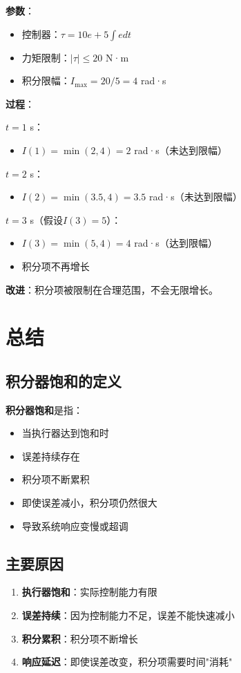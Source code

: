 \documentclass[12pt,a4paper]{article}
\begin{document}
\textbf{参数}：
\begin{itemize}
\item 控制器：$\tau = 10e + 5\int e dt$
\item 力矩限制：$|\tau| \leq 20$ N·m
\item 积分限幅：$I_{\max} = 20/5 = 4$ rad·s
\end{itemize}

\textbf{过程}：

$t = 1$ s：
\begin{itemize}
\item $I(1) = \min(2, 4) = 2$ rad·s（未达到限幅）
\end{itemize}

$t = 2$ s：
\begin{itemize}
\item $I(2) = \min(3.5, 4) = 3.5$ rad·s（未达到限幅）
\end{itemize}

$t = 3$ s（假设$I(3) = 5$）：
\begin{itemize}
\item $I(3) = \min(5, 4) = 4$ rad·s（达到限幅）
\item 积分项不再增长
\end{itemize}

\textbf{改进}：积分项被限制在合理范围，不会无限增长。

\section{总结}

\subsection{积分器饱和的定义}

\textbf{积分器饱和}是指：
\begin{itemize}
\item 当执行器达到饱和时
\item 误差持续存在
\item 积分项不断累积
\item 即使误差减小，积分项仍然很大
\item 导致系统响应变慢或超调
\end{itemize}

\subsection{主要原因}

\begin{enumerate}
\item \textbf{执行器饱和}：实际控制能力有限
\item \textbf{误差持续}：因为控制能力不足，误差不能快速减小
\item \textbf{积分累积}：积分项不断增长
\item \textbf{响应延迟}：即使误差改变，积分项需要时间"消耗"
\end{enumerate}
\end{document}

